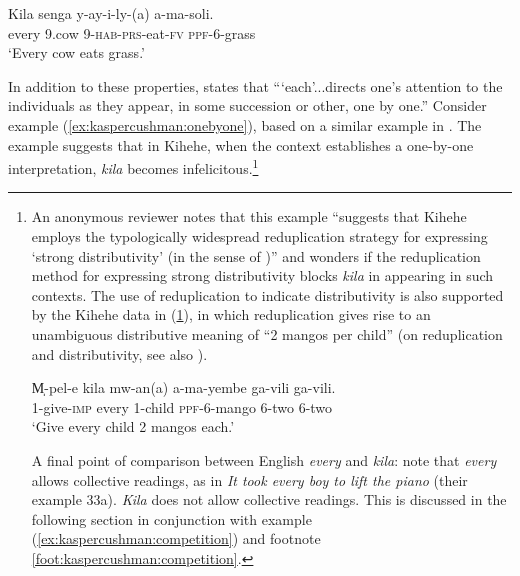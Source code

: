 \documentclass[output=paper,modfonts,nonflat]{langsci/langscibook}
\begin{document}
\begin{exe}


\ex 
\gll Kila senga y-ay-i-ly-(a) a-ma-soli. \label{ex:kaspercushman:everycow}\\
every 9.cow 9-\textsc{hab}-\textsc{prs}-eat-\textsc{fv} \textsc{ppf}-6-grass \\
\glt `Every cow eats grass.' 

\end{exe}


In addition to these properties, \cite[150]{vendler62} states that ```each'...directs one's attention to the individuals as they appear, in some succession or other, one by one.''  Consider example (\ref{ex:kaspercushman:onebyone}), based on a similar example in \cite[150]{vendler62}. The example suggests that in Kihehe, when the context establishes a one-by-one interpretation, \textit{kila} becomes infelicitous.\footnote{An anonymous reviewer notes that this example ``suggests that Kihehe employs the typologically widespread reduplication strategy for expressing `strong distributivity' (in the sense of \citealt{beghelli97})'' and wonders if the reduplication method for expressing strong distributivity blocks \textit{kila} in appearing in such contexts. The use of reduplication to indicate distributivity is also supported by the Kihehe data in (\ref{mangos}), in which reduplication gives rise to an unambiguous distributive meaning of ``2 mangos per child'' (on reduplication and distributivity, see also \citealt{balusu13}). 
\begin{exe}
\ex \label{mangos} 
\gll M̩-pel-e kila mw-an(a) a-ma-yembe ga-vili ga-vili. \\
1-give-\textsc{imp} every 1-child \textsc{ppf}-6-mango 6-two 6-two \\
\glt `Give every child 2 mangos each.' \\
\end{exe}

A final point of comparison between English \textit{every} and \textit{kila}: \cite[98]{beghelli97} note that \textit{every} allows collective readings, as in \textit{It took every boy to lift the piano} (their example 33a). \textit{Kila} does not allow collective readings. This is discussed in the following section in conjunction with example (\ref{ex:kaspercushman:competition}) and footnote \ref{foot:kaspercushman:competition}.}
\end{document}
